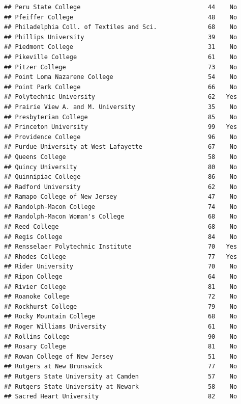 \documentclass[
]{article}
\begin{document}
\begin{verbatim}
## Peru State College                                   44    No
## Pfeiffer College                                     48    No
## Philadelphia Coll. of Textiles and Sci.              68    No
## Phillips University                                  39    No
## Piedmont College                                     31    No
## Pikeville College                                    61    No
## Pitzer College                                       73    No
## Point Loma Nazarene College                          54    No
## Point Park College                                   66    No
## Polytechnic University                               62   Yes
## Prairie View A. and M. University                    35    No
## Presbyterian College                                 85    No
## Princeton University                                 99   Yes
## Providence College                                   96    No
## Purdue University at West Lafayette                  67    No
## Queens College                                       58    No
## Quincy University                                    80    No
## Quinnipiac College                                   86    No
## Radford University                                   62    No
## Ramapo College of New Jersey                         47    No
## Randolph-Macon College                               74    No
## Randolph-Macon Woman's College                       68    No
## Reed College                                         68    No
## Regis College                                        84    No
## Rensselaer Polytechnic Institute                     70   Yes
## Rhodes College                                       77   Yes
## Rider University                                     70    No
## Ripon College                                        64    No
## Rivier College                                       81    No
## Roanoke College                                      72    No
## Rockhurst College                                    79    No
## Rocky Mountain College                               68    No
## Roger Williams University                            61    No
## Rollins College                                      90    No
## Rosary College                                       81    No
## Rowan College of New Jersey                          51    No
## Rutgers at New Brunswick                             77    No
## Rutgers State University at Camden                   57    No
## Rutgers State University at Newark                   58    No
## Sacred Heart University                              82    No

\end{verbatim}
\end{document}
